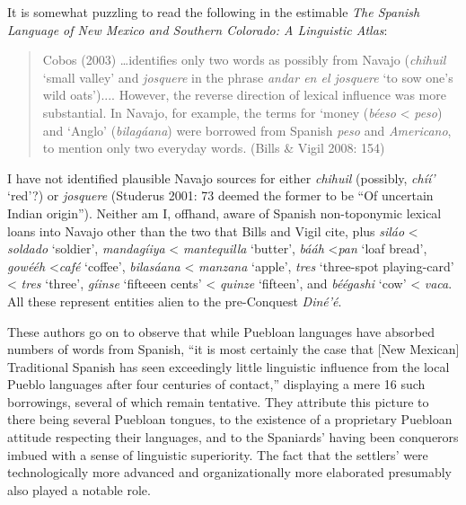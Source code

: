 It is somewhat puzzling to read the following in the estimable \textit{The Spanish Language of New Mexico and Southern Colorado: A Linguistic Atlas}:

\begin{quote}
	Cobos (2003) \ldots identifies only two words as possibly from Navajo (\textit{chihuil} ‘small valley’ and \textit{josquere} in the phrase \textit{andar en el josquere} ‘to sow one’s wild oats’)....  However, the reverse direction of lexical influence was more substantial.  In Navajo, for example, the terms for ‘money (\textit{béeso} {\textless} \textit{peso}) and ‘Anglo’ (\textit{bilagáana}) were borrowed from Spanish \textit{peso} and \textit{Americano}, to mention only two everyday words.  (Bills \& Vigil 2008: 154)
\end{quote}

I have not identified plausible Navajo sources for either \textit{chihuil} (possibly, \textit{chíí’} ‘red’?) or \textit{josquere} (Studerus 2001: 73 deemed the former to be ``Of uncertain Indian origin”).  Neither am I, offhand, aware of Spanish non-toponymic lexical loans into Navajo other than the two that Bills and Vigil cite, plus \textit{siláo} {\textless} \textit{soldado} ‘soldier’, \textit{mandagíiya} {\textless} \textit{mantequilla} ‘butter’, \textit{bááh} \textless \textit{pan} `loaf bread', \textit{gowééh} \textless \textit{café} `coffee', \textit{bilasáana} {\textless} \textit{manzana} ‘apple’, \textit{tres} ‘three-spot playing-card’ {\textless} \textit{tres }‘three’, \textit{gíinse }‘fifteeen cents’ {\textless} \textit{quinze }‘fifteen’, and \textit{béégashi }‘cow’ {\textless} \textit{vaca}.  All these represent entities alien to the pre-Conquest \textit{Diné’é}.

These authors go on to observe that while Puebloan languages have absorbed numbers of words from Spanish, “it is most certainly the case that [New Mexican] Traditional Spanish has seen exceedingly little linguistic influence from the local Pueblo languages after four centuries of contact,” displaying a mere 16 such borrowings, several of which remain tentative.  They attribute this picture to there being several Puebloan tongues, to the existence of a proprietary Puebloan attitude respecting their languages, and to the Spaniards’ having been conquerors imbued with a sense of linguistic superiority.  The fact that the settlers’ were technologically more advanced and organizationally more elaborated presumably also played a notable role.

